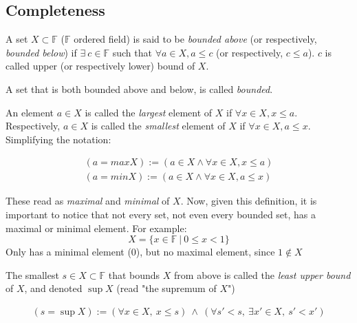 \subsection{Completeness}

\begin{definition}[Bounds]

A set $X \subset \mathbb{F}$ ($\mathbb{F}$ ordered field) is said to be \textit{bounded above} (or respectively, \textit{bounded below}) if $\exists \ c \in \mathbb{F}$ such that $\forall a \in X, a \leq c$ (or respectively, $c \leq a$). $c$ is called upper (or respectively lower) bound of $X$.

\end{definition}

\begin{definition}

A set that is both bounded above and below, is called \textit{bounded}.

\end{definition}

\begin{definition}

An element $a \in X$ is called the \textit{largest} element of $X$ if $\forall x \in X, x \leq a$. Respectively, $a \in X$ is called the \textit{smallest} element of $X$ if $\forall x \in X, a \leq x$. Simplifying the notation:

\begin{align*}
(a = max X) := (a \in X \wedge \forall x \in X, x \leq a)\\
(a = min X) := (a \in X \wedge \forall x \in X, a \leq x)
\end{align*}
\end{definition}

These read as \textit{maximal} and \textit{minimal} of $X$.
Now, given this definition, it is important to notice that not every set, not even every bounded set, has a maximal or minimal element. For example:
$$
X = \{x \in \mathbb{F} \ |\  0 \leq x < 1\}
$$
Only has a minimal element ($0$), but no maximal element, since $1 \notin X$

\begin{definition}
The smallest $s \in X \subset \mathbb{F}$ that bounds $X$ from above is called the \textit{least upper bound} of $X$, and denoted $\sup{X}$ (read "the supremum of $X$")

\begin{align*}
(s = \sup X) := \left(\forall x \in X, \ x \leq s\right) \ \wedge \ \left(\forall s' < s, \ \exists x' \in X, \ s' < x'\right)
\end{align*}
\end{definition}

